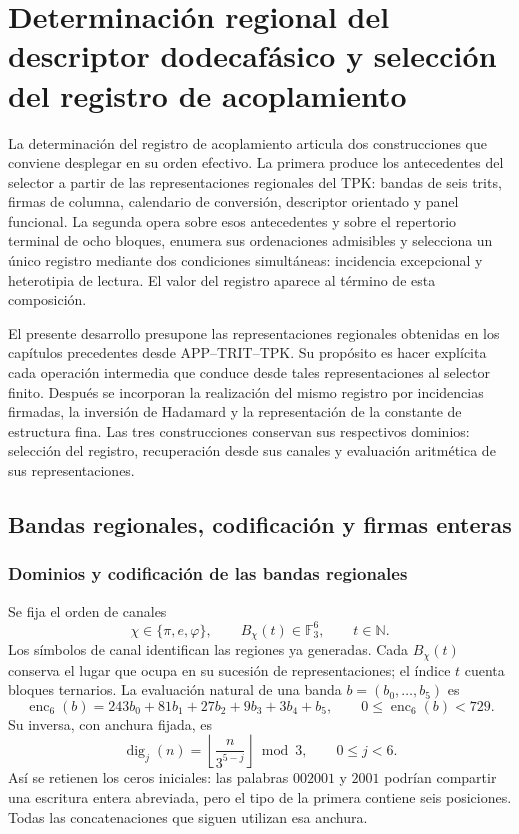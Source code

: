 \section{Determinación regional del descriptor dodecafásico y selección del registro de acoplamiento}
\label{act21:chap:despliegue-selector-k}

La determinación del registro de acoplamiento articula dos construcciones
que conviene desplegar en su orden efectivo. La primera produce los
antecedentes del selector a partir de las representaciones regionales del TPK:
bandas de seis trits, firmas de columna, calendario de conversión,
descriptor orientado y panel funcional. La segunda opera sobre esos
antecedentes y sobre el repertorio terminal de ocho bloques, enumera sus
ordenaciones admisibles y selecciona un único registro mediante dos
condiciones simultáneas: incidencia excepcional y heterotipia de lectura.
El valor del registro aparece al término de esta composición.

El presente desarrollo presupone las representaciones regionales obtenidas
en los capítulos precedentes desde APP--TRIT--TPK. Su propósito es hacer
explícita cada operación intermedia que conduce desde tales representaciones
al selector finito. Después se incorporan la realización del mismo
registro por incidencias firmadas, la inversión de Hadamard y la
representación de la constante de estructura fina. Las tres construcciones
conservan sus respectivos dominios: selección del registro, recuperación
desde sus canales y evaluación aritmética de sus representaciones.

\subsection{Bandas regionales, codificación y firmas enteras}

\subsubsection{Dominios y codificación de las bandas regionales}

Se fija el orden de canales
\[
 \chi\in\{\pi,e,\varphi\},
 \qquad B_\chi(t)\in\mathbb F_3^6,
 \qquad t\in\mathbb N.
\]
Los símbolos de canal identifican las regiones ya generadas. Cada
$B_\chi(t)$ conserva el lugar que ocupa en su sucesión de representaciones;
el índice $t$ cuenta bloques ternarios. La evaluación natural de una
banda $b=(b_0,\ldots,b_5)$ es
\begin{equation}
 \operatorname{enc}_6(b)=
 243b_0+81b_1+27b_2+9b_3+3b_4+b_5,
 \qquad 0\leq\operatorname{enc}_6(b)<729.
 \label{act21:eq:kdes-enc6}
\end{equation}
Su inversa, con anchura fijada, es
\[
 \operatorname{dig}_j(n)=
 \left\lfloor\frac{n}{3^{5-j}}\right\rfloor\bmod3,
 \qquad 0\leq j<6.
\]
Así se retienen los ceros iniciales: las palabras $002001$ y $2001$
podrían compartir una escritura entera abreviada, pero el tipo de la
primera contiene seis posiciones. Todas las concatenaciones que siguen
utilizan esa anchura.

